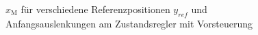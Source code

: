 \documentclass[
	pagesize,
	fontsize=12pt,
	paper=a4,
	oneside,
   reqno
]{scrartcl}
\begin{document}
\begin{figure}[H]
    \centering
    \caption[$x_{\mathrm{M}}$ für Regler mit Vorsteuerung]{$x_{\mathrm{M}}$ für verschiedene Referenzpositionen $y_{ref}$ und Anfangsauslenkungen am Zustandsregler mit Vorsteuerung}
    \label{fig:Bild16}
\end{figure}
\end{document}
